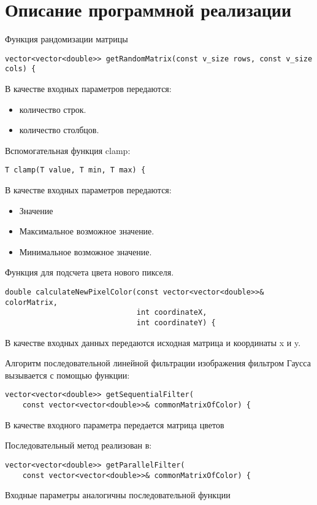 \documentclass{report}
\begin{document}
\section*{Описание программной реализации}
Функция рандомизации матрицы
\begin{lstlisting}
vector<vector<double>> getRandomMatrix(const v_size rows, const v_size cols) {
\end{lstlisting}
\par В качестве входных параметров передаются:
\begin{itemize}
\item количество строк.
\item количество столбцов.
\end{itemize}
\par Вспомогательная функция clamp:
\begin{lstlisting}
T clamp(T value, T min, T max) {
\end{lstlisting}
\par В качестве входных параметров передаются:
\begin{itemize}
\item Значение 
\item Максимальное возможное значение.
\item Минимальное возможное значение.
\end{itemize}
\par Функция для подсчета цвета нового пикселя.
\begin{lstlisting}
double calculateNewPixelColor(const vector<vector<double>>& colorMatrix,
                              int coordinateX,
                              int coordinateY) {
\end{lstlisting}
\par В качестве входных данных передаются исходная матрица и координаты x и y.
\par Алгоритм последовательной линейной фильтрации изображения фильтром Гаусса вызывается с помощью функции:
\begin{lstlisting}
vector<vector<double>> getSequentialFilter(
    const vector<vector<double>>& commonMatrixOfColor) {
\end{lstlisting}
\par В качестве входного параметра передается матрица цветов
\par Последовательный метод реализован в:
\begin{lstlisting}
vector<vector<double>> getParallelFilter(
    const vector<vector<double>>& commonMatrixOfColor) {
\end{lstlisting}
\par Входные параметры аналогичны последовательной функции
\end{document}
